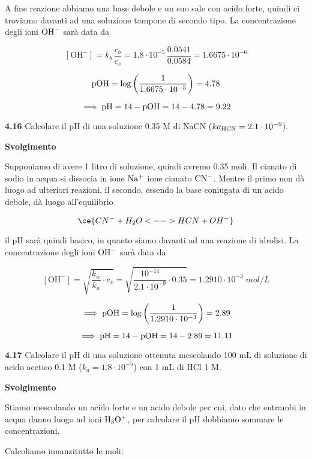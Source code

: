 A fine reazione abbiamo una base debole e un suo sale con acido forte, quindi ci troviamo davanti ad una soluzione tampone di secondo tipo. La concentrazione degli ioni $\rm OH^-$ sarà data da

$$[\text{OH}^-]=k_b\,\frac{c_b}{c_s}
=1.8 \cdot 10^{-5}\,\frac{0.0541}{0.0584}
=1.6675 \cdot 10^{-6}$$

$$\rm pOH=\log \left( \frac{1}{1.6675 \cdot 10^{-5}} \right)=4.78$$

$$\implies \rm pH=14-pOH=14-4.78=9.22$$

\vspace{0.2cm}\textbf{4.16} Calcolare il pH di una soluzione 0.35 M di NaCN ($k{a_{\rm HCN}} = 2.1 \cdot 10^{-9}$).

\vspace{0.2cm}\large\textbf{Svolgimento}\normalsize

\vspace{0.2cm}Supponiamo di avere 1 litro di soluzione, quindi avremo 0.35 moli. Il cianato di sodio in acqua si dissocia in ione $\rm Na^+$ ione cianato $\rm CN^-$. Mentre il primo non dà luogo ad ulteriori reazioni, il secondo, essendo la base coniugata di un acido debole, dà luogo all'equilibrio

$$\ce{CN^- + H_2O <--> HCN + OH^-}$$

il pH sarà quindi basico, in quanto siamo davanti ad una reazione di idrolisi. La concentrazione degli ioni $\rm OH^-$ sarà data da


$$[\text{OH}^-]
=\sqrt{\frac{k_w}{k_a}\cdot c_s}
=\sqrt{\frac{10^{-14}}{2.1 \cdot 10^{-9}} \cdot 0.35}
=1.2910 \cdot 10^{-3}\;mol/L$$

$$\implies \rm pOH
=\log{\left(\frac{1}{1.2910 \cdot 10^{-3}}\right)}
=2.89$$

$$\implies \rm pH=14-pOH=14-2.89=11.11$$

\vspace{0.2cm}\textbf{4.17} Calcolare il pH di una soluzione ottenuta mescolando 100 mL di soluzione di acido acetico 0.1 M ($k_a=1.8 \cdot 10^{-5}$) con 1 mL di HCl 1 M.

\vspace{0.2cm}\large\textbf{Svolgimento}\normalsize

\vspace{0.2cm}Stiamo mescolando un acido forte e un acido debole per cui, dato che entrambi in acqua danno luogo ad ioni $\rm H_3O^+$, per calcolare il pH dobbiamo sommare le concentrazioni.

Calcoliamo innanzitutto le moli:

